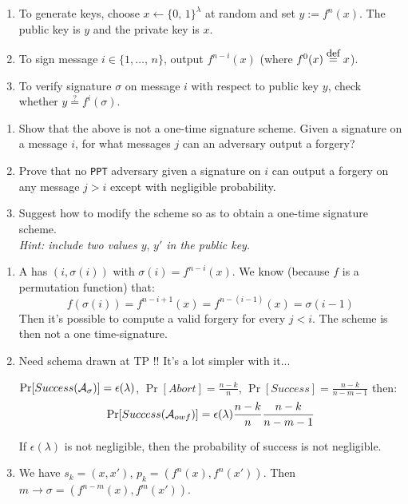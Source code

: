 \begin{enumerate}
	\item[\textbullet] To generate keys, choose $x\leftarrow \{0,\,1\}^\lambda$ at random
	      and set $y:=f^n(x)$. The public key is $y$ and the private key is $x$.
	\item[\textbullet] To sign message $i\in\{1,\ldots,\,n\}$, output $f^{n-i}(x)$
	      (where $f^0(x)\stackrel{\mbox{\small def}}{=}x$).
	\item[\textbullet] To verify signature $\sigma$ on message $i$ with respect to
	      public key $y$, check whether $y\stackrel{?}{=}f^i(\sigma)$. 
\end{enumerate}

\begin{enumerate}
	\item Show that the above is not a one-time signature scheme. Given
	      a signature on a message $i$, for what messages $j$ can an 
	      adversary output a forgery?
	\item Prove that no \texttt{PPT} adversary given a signature on $i$
	      can output a forgery on any message $j>i$ except with negligible
	      probability.
	\item Suggest how to modify the scheme so as to obtain a one-time 
	      signature scheme. \\
	      \emph{Hint: include two values $y,\,y'$ in the public key.}
\end{enumerate}
\begin{solution}
  \begin{enumerate}
    \item
      A has $(i, \sigma(i))$ with $\sigma (i) = f^{n-i} (x)$. We know (because $f$ is a permutation function) that:
      $$f(\sigma(i)) = f^{n-i+1}(x) = f^{n-(i-1)}(x) = \sigma(i-1)$$
      Then it's possible to compute a valid forgery for every $j < i$. The scheme is then not a one time-signature.
    \item
      Need schema drawn at TP !! It's a lot simpler with it...

      $\Pr[Success (\mathcal{A}_\sigma)] = \epsilon(\lambda)$, $\Pr[Abort] = \frac{n-k}{n}$, $\Pr[Success] = \frac{n-k}{n-m-1}$ then:
      $$ \Pr[Success(\mathcal{A}_{owf})] = \epsilon(\lambda) \frac{n-k}{n} \frac{n-k}{n-m-1}$$

      If $\epsilon(\lambda)$ is not negligible, then the probability of success is not negligible.
    \item
      We have $s_k = (x, x')$, $p_k = (f^n(x), f^n(x'))$.
      Then $m \rightarrow \sigma = (f^{n-m}(x), f^m(x'))$.

  \end{enumerate}
\end{solution}


